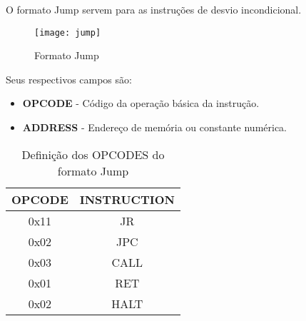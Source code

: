  O formato Jump servem para as instruções de desvio incondicional.  	
   	\begin{figure}[H]
    	\centering
    	\texttt{[image: jump]}
    	\caption{Formato Jump}
		\label{jump}
  	\end{figure}
Seus respectivos campos são:
	\begin{itemize}
	\item \textbf{OPCODE} - Código da operação básica da instrução.
	\item \textbf{ADDRESS} - Endereço de memória ou constante numérica.
\end{itemize}
 
\begin{table}[H]
\centering 	
  	\begin{tabular}{|c|c|}
  	\hline 
  	\cellcolor[gray]{0.9}\textbf{OPCODE} & \cellcolor[gray]{0.9}\textbf{INSTRUCTION} \\ 
  	\hline 
  	0x11 & JR \\ 
  	\hline 
  	0x02 & JPC \\ 
  	\hline 
  	0x03 & CALL \\ 
  	\hline 
  	0x01 & RET \\ 
  	\hline 
  	0x02 & HALT \\ 
  	\hline 
  	\end{tabular} 
  	  	\caption{Definição dos OPCODES do formato Jump}
\end{table}